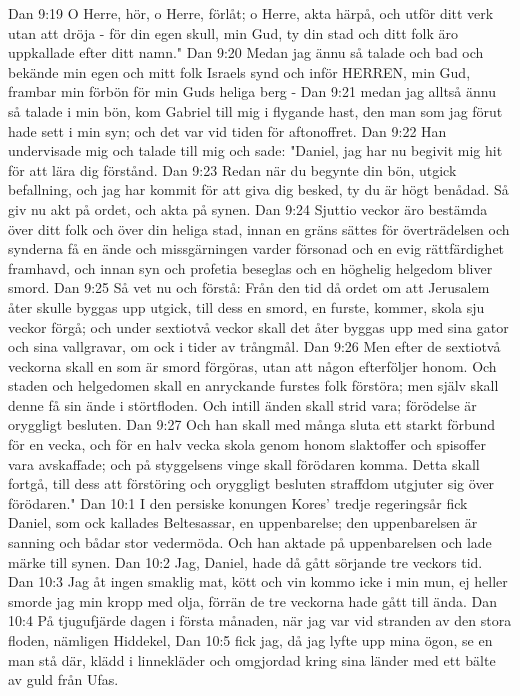 Dan 9:19  O Herre, hör, o Herre, förlåt; o Herre, akta härpå, och utför ditt verk utan att dröja - för din egen skull, min Gud, ty din stad och ditt folk äro uppkallade efter ditt namn."
Dan 9:20  Medan jag ännu så talade och bad och bekände min egen och mitt folk Israels synd och inför HERREN, min Gud, frambar min förbön för min Guds heliga berg -
Dan 9:21  medan jag alltså ännu så talade i min bön, kom Gabriel till mig i flygande hast, den man som jag förut hade sett i min syn; och det var vid tiden för aftonoffret.
Dan 9:22  Han undervisade mig och talade till mig och sade: "Daniel, jag har nu begivit mig hit för att lära dig förstånd.
Dan 9:23  Redan när du begynte din bön, utgick befallning, och jag har kommit för att giva dig besked, ty du är högt benådad. Så giv nu akt på ordet, och akta på synen.
Dan 9:24  Sjuttio veckor äro bestämda över ditt folk och över din heliga stad, innan en gräns sättes för överträdelsen och synderna få en ände och missgärningen varder försonad och en evig rättfärdighet framhavd, och innan syn och profetia beseglas och en höghelig helgedom bliver smord.
Dan 9:25  Så vet nu och förstå: Från den tid då ordet om att Jerusalem åter skulle byggas upp utgick, till dess en smord, en furste, kommer, skola sju veckor förgå; och under sextiotvå veckor skall det åter byggas upp med sina gator och sina vallgravar, om ock i tider av trångmål.
Dan 9:26  Men efter de sextiotvå veckorna skall en som är smord förgöras, utan att någon efterföljer honom. Och staden och helgedomen skall en anryckande furstes folk förstöra; men själv skall denne få sin ände i störtfloden. Och intill änden skall strid vara; förödelse är oryggligt besluten.
Dan 9:27  Och han skall med många sluta ett starkt förbund för en vecka, och för en halv vecka skola genom honom slaktoffer och spisoffer vara avskaffade; och på styggelsens vinge skall förödaren komma. Detta skall fortgå, till dess att förstöring och oryggligt besluten straffdom utgjuter sig över förödaren."
Dan 10:1  I den persiske konungen Kores' tredje regeringsår fick Daniel, som ock kallades Beltesassar, en uppenbarelse; den uppenbarelsen är sanning och bådar stor vedermöda. Och han aktade på uppenbarelsen och lade märke till synen.
Dan 10:2  Jag, Daniel, hade då gått sörjande tre veckors tid.
Dan 10:3  Jag åt ingen smaklig mat, kött och vin kommo icke i min mun, ej heller smorde jag min kropp med olja, förrän de tre veckorna hade gått till ända.
Dan 10:4  På tjugufjärde dagen i första månaden, när jag var vid stranden av den stora floden, nämligen Hiddekel,
Dan 10:5  fick jag, då jag lyfte upp mina ögon, se en man stå där, klädd i linnekläder och omgjordad kring sina länder med ett bälte av guld från Ufas.
